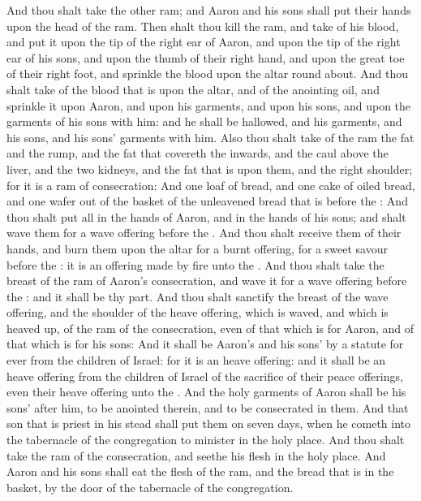 \begin{biblechapter}
\verse And thou shalt take the other ram; and Aaron and his sons shall put their hands upon the head of the ram.
\verse Then shalt thou kill the ram, and take of his blood, and put it upon the tip of the right ear of Aaron, and upon the tip of the right ear of his sons, and upon the thumb of their right hand, and upon the great toe of their right foot, and sprinkle the blood upon the altar round about.
\verse And thou shalt take of the blood that is upon the altar, and of the anointing oil, and sprinkle it upon Aaron, and upon his garments, and upon his sons, and upon the garments of his sons with him: and he shall be hallowed, and his garments, and his sons, and his sons' garments with him.
\verse Also thou shalt take of the ram the fat and the rump, and the fat that covereth the inwards, and the caul above the liver, and the two kidneys, and the fat that is upon them, and the right shoulder; for it is a ram of consecration:
\verse And one loaf of bread, and one cake of oiled bread, and one wafer out of the basket of the unleavened bread that is before the \LORD:
\verse And thou shalt put all in the hands of Aaron, and in the hands of his sons; and shalt wave them for a wave offering before the \LORD.
\verse And thou shalt receive them of their hands, and burn them upon the altar for a burnt offering, for a sweet savour before the \LORD: it is an offering made by fire unto the \LORD.
\verse And thou shalt take the breast of the ram of Aaron's consecration, and wave it for a wave offering before the \LORD: and it shall be thy part.
\verse And thou shalt sanctify the breast of the wave offering, and the shoulder of the heave offering, which is waved, and which is heaved up, of the ram of the consecration, even of that which is for Aaron, and of that which is for his sons:
\verse And it shall be Aaron's and his sons' by a statute for ever from the children of Israel: for it is an heave offering: and it shall be an heave offering from the children of Israel of the sacrifice of their peace offerings, even their heave offering unto the \LORD.
\verse And the holy garments of Aaron shall be his sons' after him, to be anointed therein, and to be consecrated in them.
\verse And that son that is priest in his stead shall put them on seven days, when he cometh into the tabernacle of the congregation to minister in the holy place.
\verse And thou shalt take the ram of the consecration, and seethe his flesh in the holy place.
\verse And Aaron and his sons shall eat the flesh of the ram, and the bread that is in the basket, by the door of the tabernacle of the congregation.

\end{biblechapter}
